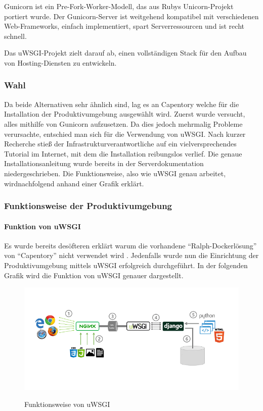 Gunicorn ist ein Pre-Fork-Worker-Modell\cite{prefork}, das aus Rubys
Unicorn-Projekt portiert wurde. Der Gunicorn-Server ist weitgehend
kompatibel mit verschiedenen Web-Frameworks, einfach implementiert,
spart Serverressourcen und ist recht schnell.

Das uWSGI-Projekt zielt darauf ab, einen vollständigen Stack für den
Aufbau von Hosting-Diensten zu entwickeln.

\hypertarget{wahl}{%
\subsubsection{Wahl}\label{wahl}}

Da beide Alternativen sehr ähnlich sind, lag es an Capentory welche für
die Installation der Produktivumgebung ausgewählt wird. Zuerst wurde
versucht, alles mithilfe von Gunicorn aufzusetzen. Da dies jedoch
mehrmalig Probleme verursachte, entschied man sich für die Verwendung
von uWSGI. Nach kurzer Recherche stieß der Infrastrukturverantwortliche
auf ein vielversprechendes Tutorial im Internet\cite{tutorialuwsgi}, mit
dem die Installation reibungslos verlief. Die genaue
Installationsanleitung wurde bereits in der Serverdokumentation
niedergeschrieben. Die Funktionsweise, also wie uWSGI genau arbeitet,
wirdnachfolgend  anhand einer Grafik erklärt.

\hypertarget{funktionsweise-der-produktivumgebung}{%
\subsubsection{Funktionsweise der
Produktivumgebung}\label{funktionsweise-der-produktivumgebung}}

\hypertarget{funktion-von-uwsgi}{%
\paragraph{Funktion von uWSGI}\label{funktion-von-uwsgi}}

Es wurde bereits desöfteren erklärt warum die vorhandene
``Ralph-Dockerlösung'' von ``Capentory'' nicht verwendet wird
. Jedenfalls wurde nun die
Einrichtung der Produktivumgebung mittels uWSGI erfolgreich
durchgeführt. In der folgenden Grafik wird die Funktion von uWSGI
genauer dargestellt.

\begin{figure}[ht]
\centering
\includegraphics{uwsgi.png}
\caption{Funktionsweise von uWSGI}
\cite{uwsgi}
\end{figure}

